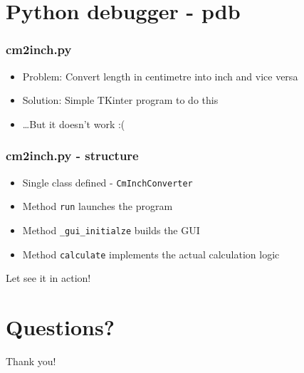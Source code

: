 \documentclass[14pt,notes,svgnames,aspectratio=169]{beamer}
\begin{document}
\begingroup
    \section{Python debugger - pdb}
\endgroup

\begin{frame}
    \frametitle{cm2inch.py}
    \begin{itemize}
        \item Problem: Convert length in centimetre into inch and vice versa
        \item Solution: Simple TKinter program to do this
        \pause
        \item …But it doesn't work :(
    \end{itemize}
\end{frame}

\begin{frame}
    \frametitle{cm2inch.py - structure}
    \begin{itemize}
        \item Single class defined - \lstinline{CmInchConverter}
        \item Method \lstinline{run} launches the program
        \item Method \lstinline{_gui_initialze} builds the GUI
        \item Method \lstinline{calculate} implements the actual calculation logic
    \end{itemize}
\end{frame}

\begin{frame}
    \centerline{\Large Let see it in action!}
\end{frame}

\begingroup
    \section{Questions?}
\endgroup

\begin{frame}
    \centerline{\Large Thank you!}
\end{frame}
\end{document}
